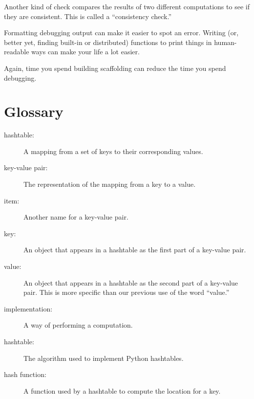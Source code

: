 \documentclass[10pt]{book}
\begin{document}
{\begin{description}
Another kind of check compares the results of two different
computations to see if they are consistent.  This is called a
``consistency check.''

\item[Pretty print the output:] Formatting debugging output
can make it easier to spot an error. Writing (or, better yet,
finding built-in or distributed) functions to print things in
human-readable ways can make your life a lot easier.


\end{description}

Again, time you spend building scaffolding can reduce
the time you spend debugging.


\section{Glossary}

\begin{description}

\item[hashtable:] A mapping from a set of keys to their
corresponding values.

\item[key-value pair:] The representation of the mapping from
a key to a value.

\item[item:] Another name for a key-value pair.

\item[key:] An object that appears in a hashtable as the
first part of a key-value pair.

\item[value:] An object that appears in a hashtable as the
second part of a key-value pair.  This is more specific than
our previous use of the word ``value.''

\item[implementation:] A way of performing a computation.

\item[hashtable:] The algorithm used to implement Python
hashtables.

\item[hash function:] A function used by a hashtable to compute the
location for a key.
% 


\end{description}}
\end{document}
